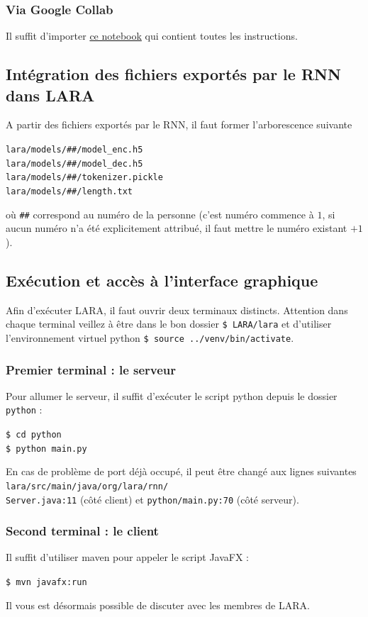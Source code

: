 \documentclass[10pt,a4paper]{article}
\begin{document}
\subsubsection{Via Google Collab}
Il suffit d'importer \href{https://github.com/LaraProject/notebooks/blob/master/LaraProject_RNN.ipynb}{ce notebook} qui contient toutes les instructions.

\subsection{Intégration des fichiers exportés par le RNN dans LARA}
A partir des fichiers exportés par le RNN, il faut former l’arborescence suivante
\begin{center}
	\texttt{lara/models/\#\#/model\_enc.h5} \\
	\texttt{lara/models/\#\#/model\_dec.h5} \\
	\texttt{lara/models/\#\#/tokenizer.pickle} \\
	\texttt{lara/models/\#\#/length.txt}
\end{center}
où \texttt{\#\#} correspond au numéro de la personne (c'est numéro commence à $1$, si aucun numéro n'a été explicitement attribué, il faut mettre le numéro existant $+1$).

\subsection{Exécution et accès à l'interface graphique}
Afin d'exécuter LARA, il faut ouvrir deux terminaux distincts. Attention dans chaque terminal veillez à être dans le bon dossier \texttt{\$ LARA/lara} et d'utiliser l'environnement virtuel python \texttt{\$ source ../venv/bin/activate}.
\subsubsection{Premier terminal : le serveur}
Pour allumer le serveur, il suffit d’exécuter le script python depuis le dossier \texttt{python} :
\begin{center}
	\texttt{\$ cd python} \\
	\texttt{\$ python main.py}
\end{center}
En cas de problème de port déjà occupé, il peut être changé aux lignes suivantes \texttt{lara/src/main/java/org/lara/rnn/\\Server.java:11} (côté client) et \texttt{python/main.py:70} (côté serveur).
\subsubsection{Second terminal : le client}
Il suffit d'utiliser maven pour appeler le script JavaFX :
\begin{center}
	\texttt{\$ mvn javafx:run}
\end{center}
Il vous est désormais possible de discuter avec les membres de LARA.
\end{document}

